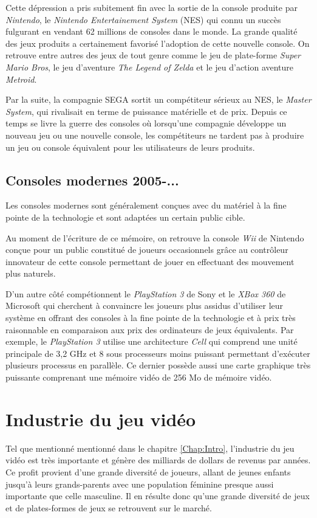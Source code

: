 \documentclass[12pt,oneside,letterpaper,francais]{book}
\begin{document}
Cette dépression a pris subitement fin avec la sortie de la console
produite par \textit{Nintendo}, le \textit{Nintendo Entertainement
  System} (NES) qui connu un succès fulgurant en vendant 62 millions
de consoles dans le monde. La grande qualité des jeux produits a
certainement favorisé l'adoption de cette nouvelle console. On
retrouve entre autres des jeux de tout genre comme le jeu de
plate-forme \textit{Super Mario Bros}, le jeu d'aventure \textit{The
  Legend of Zelda} et le jeu d'action aventure \textit{Metroid}.

Par la suite, la compagnie SEGA sortit un compétiteur sérieux au NES,
le \textit{Master System}, qui rivalisait en terme de puissance
matérielle et de prix. Depuis ce temps se livre la guerre des consoles
où lorsqu'une compagnie développe un nouveau jeu ou une nouvelle
console, les compétiteurs ne tardent pas à produire un jeu ou console
équivalent pour les utilisateurs de leurs produits.

\subsection{Consoles modernes 2005-...}
Les consoles modernes sont généralement conçues avec du matériel à la
fine pointe de la technologie et sont adaptées un certain public
cible.

Au moment de l'écriture de ce mémoire, on retrouve la console
\textit{Wii} de Nintendo conçue pour un public constitué de joueurs
occasionnels grâce au contrôleur innovateur de cette console
permettant de jouer en effectuant des mouvement plus naturels.

D'un autre côté compétionnent le \textit{PlayStation 3} de Sony et le
\textit{XBox 360} de Microsoft qui cherchent à convaincre les joueurs
plus assidus d'utiliser leur système en offrant des consoles à la fine
pointe de la technologie et à prix très raisonnable en comparaison aux
prix des ordinateurs de jeux équivalents. Par exemple, le
\textit{PlayStation 3} utilise une architecture \textit{Cell} qui
comprend une unité principale de 3,2 GHz et 8 sous processeurs moins
puissant permettant d'exécuter plusieurs processus en parallèle. Ce
dernier possède aussi une carte graphique très puissante comprenant
une mémoire vidéo de 256 Mo de mémoire vidéo. 



\section{Industrie du jeu vidéo}
Tel que mentionné mentionné dans le chapitre \ref{Chap:Intro},
l'industrie du jeu vidéo est très importante et génère des milliards
de dollars de revenus par années. Ce profit provient d'une grande
diversité de joueurs, allant de jeunes enfants jusqu'à leurs
grands-parents avec une population féminine presque aussi importante
que celle masculine. Il en résulte donc qu'une grande diversité de
jeux et de plates-formes de jeux se retrouvent sur le marché.
\end{document}
